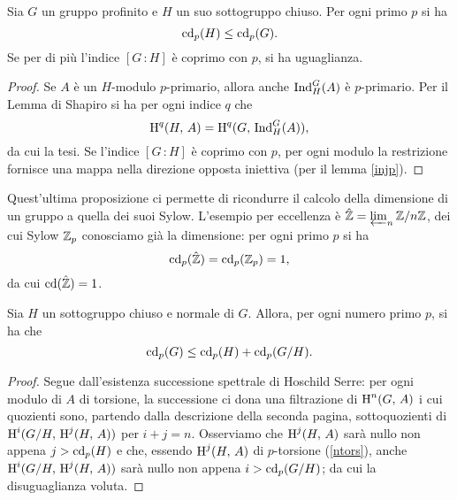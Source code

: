 \begin{proposition}
	Sia $ G $ un gruppo profinito e $ H $ un suo sottogruppo chiuso. Per ogni primo $ p $ si ha
	\[ \operatorname{cd}_p(H) \leq \operatorname{cd}_p(G). \]
	Se per di più l'indice $ [G\,\colon H] $ è coprimo con $ p $, si ha uguaglianza.
\end{proposition}
\begin{proof}
	Se $ A $ è un $ H $-modulo $ p $-primario, allora anche $ \operatorname{Ind}_H^G(A) $ è $ p $-primario. Per il Lemma di Shapiro si ha per ogni indice $ q $ che
	\[ \operatorname{H}^q(H, \, A) = \operatorname{H}^q(G, \, \operatorname{Ind}_H^G(A)),  \]
	da cui la tesi. Se l'indice $ [G\,\colon H] $ è coprimo con $ p $, per ogni modulo la restrizione fornisce una mappa nella direzione opposta iniettiva (per il lemma \ref{injp}).
\end{proof}

Quest'ultima proposizione ci permette di ricondurre il calcolo della dimensione di un gruppo a quella dei suoi Sylow. L'esempio per eccellenza è $ \hat{\mathbb{Z}} = \varprojlim_n \mathbb{Z}/n\mathbb{Z} $, dei cui Sylow $ \mathbb{Z}_p$ conosciamo già la dimensione: per ogni primo $ p $ si ha
\[ \operatorname{cd}_p(\hat{\mathbb{Z}}) = \operatorname{cd}_p(\mathbb{Z}_p) = 1, \]
da cui $ \operatorname{cd}(\hat{\mathbb{Z}})=1 $.

\begin{proposition}\label{quozienti}
	Sia $ H $ un sottogruppo chiuso e normale di $ G $. Allora, per ogni numero primo $ p $, si ha che
	\[ \operatorname{cd}_p(G) \leq \operatorname{cd}_p(H) + \operatorname{cd}_p(G/H). \]
\end{proposition}
\begin{proof}
	Segue dall'esistenza successione spettrale di Hoschild Serre: per ogni modulo di $ A $ di torsione, la successione ci dona una filtrazione di $ \operatorname{H}^n(G, \, A) $ i cui quozienti sono, partendo dalla descrizione della seconda pagina, sottoquozienti di $ \operatorname{H}^i(G/H, \, \operatorname{H}^j(H, \, A)) $ per $ i+j = n $. Osserviamo che $ \operatorname{H}^j(H, \, A) $ sarà nullo non appena $ j > \operatorname{cd}_p(H) $ e che, essendo $ \operatorname{H}^j(H, \, A) $ di $ p $-torsione (\ref{ntors}), anche $ \operatorname{H}^i(G/H, \, \operatorname{H}^j(H, \, A)) $ sarà nullo non appena $ i > \operatorname{cd}_p(G/H) $; da cui la disuguaglianza voluta.
\end{proof}